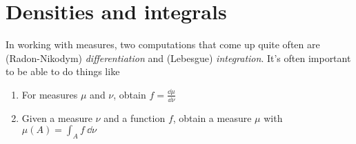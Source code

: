 \documentclass{juliacon}
\begin{document}









\section{Densities and integrals}

In working with measures, two computations that come up quite often are (Radon-Nikodym) \emph{differentiation} and (Lebesgue) \emph{integration}. It's often important to be able to do things like
\begin{enumerate}
    \item For measures $\mu$ and $\nu$, obtain $f=\frac{\dd\mu}{\dd\nu}$
    \item Given a measure $\nu$ and a function $f$, obtain a measure $\mu$ with $\mu(A)=\int_A f\ \dd\nu$
\end{enumerate}
\end{document}

